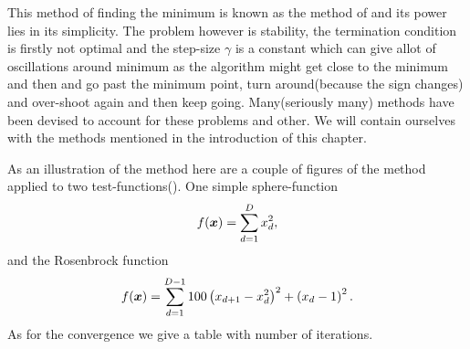     This method of finding the minimum is known as the method of
     and its power lies in its simplicity. The problem
    however is stability, the termination condition is firstly not optimal and
    the step-size $\gamma$ is a constant which can give allot of oscillations
    around minimum as the algorithm might get close to the minimum and then
     and go past the minimum point, turn around(because the
    sign changes) and over-shoot again and then keep going.  Many(seriously
    many) methods have been devised to account for these problems and other. We
    will contain ourselves with the methods mentioned in the introduction of
    this chapter.

    As an illustration of the method here are a couple of figures of the method
    applied to two test-functions(). One simple
    sphere-function
        \begin{equation}
            f(\blds{x}) = \suml{d=1}{D} x^2_d,
        \end{equation}
    and the Rosenbrock function
        \begin{equation}
            f(\blds{x}) = \suml{d=1}{D-1} 100\left(x_{d+1} - x^2_d\right)^2 +
            \left(x_d - 1\right)^2.
        \end{equation}
     
    As for the convergence we give a table with number of iterations.
